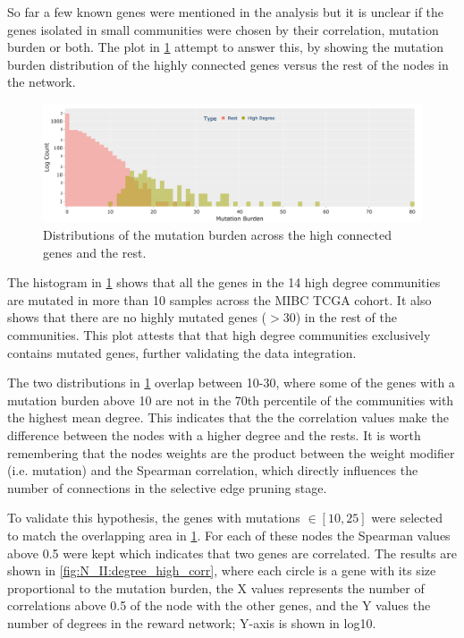 So far a few known genes were mentioned in the analysis but it is unclear if the genes isolated in small communities were chosen by their correlation, mutation burden or both. The plot in \cref{fig:N_II:hist_molecular_highCon} attempt to answer this, by showing the mutation burden distribution of the highly connected genes versus the rest of the nodes in the network.

\begin{figure}[!htb]    
    \centering
        \includegraphics[width=1.0\textwidth,height=1.0\textheight,keepaspectratio]{Sections/Network_II/resources/reward/smallCom_MutHist.png}
        \caption{Distributions of the mutation burden across the high connected genes and the rest.}
        \label{fig:N_II:hist_molecular_highCon}
\end{figure}


The histogram in \cref{fig:N_II:hist_molecular_highCon} shows that all the genes in the 14 high degree communities are mutated in more than 10 samples across the MIBC TCGA cohort. It also shows that there are no highly mutated genes ($>$30) in the rest of the communities. This plot attests that that high degree communities exclusively contains mutated genes, further validating the data integration.

The two distributions in \cref{fig:N_II:hist_molecular_highCon} overlap between 10-30, where some of the genes with a mutation burden above 10 are not in the 70th percentile of the communities with the highest mean degree. This indicates that the the correlation values make the difference between the nodes with a higher degree and the rests. It is worth remembering that the nodes weights are the product between the weight modifier (i.e. mutation) and the Spearman correlation, which directly influences the number of connections in the selective edge pruning stage.

To validate this hypothesis, the genes with mutations $\in[10,25]$ were selected to match the overlapping area in \cref{fig:N_II:hist_molecular_highCon}. For each of these nodes the Spearman values above 0.5 were kept which indicates that two genes are correlated. The results are shown in \cref{fig:N_II:degree_high_corr}, where each circle is a gene with its size proportional to the mutation burden, the X values represents the number of correlations above 0.5 of the node with the other genes, and the Y values the number of degrees in the reward network; Y-axis is shown in log10. 

